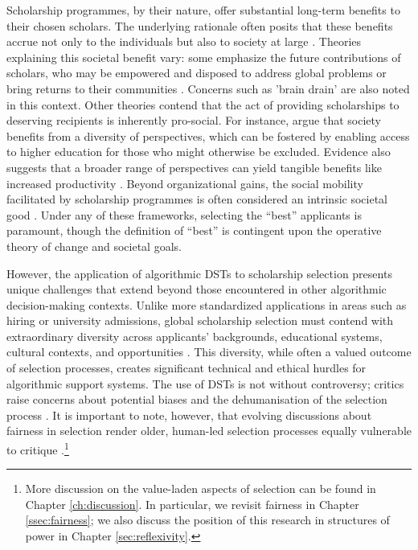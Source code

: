 Scholarship programmes, by their nature, offer substantial long-term benefits to their chosen scholars. The underlying rationale often posits that these benefits accrue not only to the individuals but also to society at large \cite{DilraboJonbekova_Ruby_2023,Dassin_Marsh_Mawer_2018}. Theories explaining this societal benefit vary: some emphasize the future contributions of scholars, who may be empowered and disposed to address global problems or bring returns to their communities \cite{Dassin_Marsh_Mawer_2018}. Concerns such as 'brain drain' are also noted in this context. Other theories contend that the act of providing scholarships to deserving recipients is inherently pro-social. For instance, \textcite{minkin2023diversity} argue that society benefits from a diversity of perspectives, which can be fostered by enabling access to higher education for those who might otherwise be excluded. Evidence also suggests that a broader range of perspectives can yield tangible benefits like increased productivity \cite{autor2008does,noray2023systemic}. Beyond organizational gains, the social mobility facilitated by scholarship programmes is often considered an intrinsic societal good \cite{Dassin_Marsh_Mawer_2018}. Under any of these frameworks, selecting the ``best'' applicants is paramount, though the definition of ``best'' is contingent upon the operative theory of change and societal goals.

However, the application of algorithmic DSTs to scholarship selection presents unique challenges that extend beyond those encountered in other algorithmic decision-making contexts. Unlike more standardized applications in areas such as hiring or university admissions, global scholarship selection must contend with extraordinary diversity across applicants' backgrounds, educational systems, cultural contexts, and opportunities \cite{Warikoo_2019}. This diversity, while often a valued outcome of selection processes, creates significant technical and ethical hurdles for algorithmic support systems. The use of DSTs is not without controversy; critics raise concerns about potential biases \cite{dwork_fairness_2012} and the dehumanisation of the selection process \cite{binns_its_2018}. It is important to note, however, that evolving discussions about fairness in selection render older, human-led selection processes equally vulnerable to critique \cite{Ahnaf2023AHPAP,pmlr-v80-kearns18a}.\footnote{More discussion on the value-laden aspects of selection can be found in Chapter \ref{ch:discussion}. In particular, we revisit fairness in Chapter \ref{ssec:fairness}; we also discuss the position of this research in structures of power in Chapter \ref{sec:reflexivity}.}

